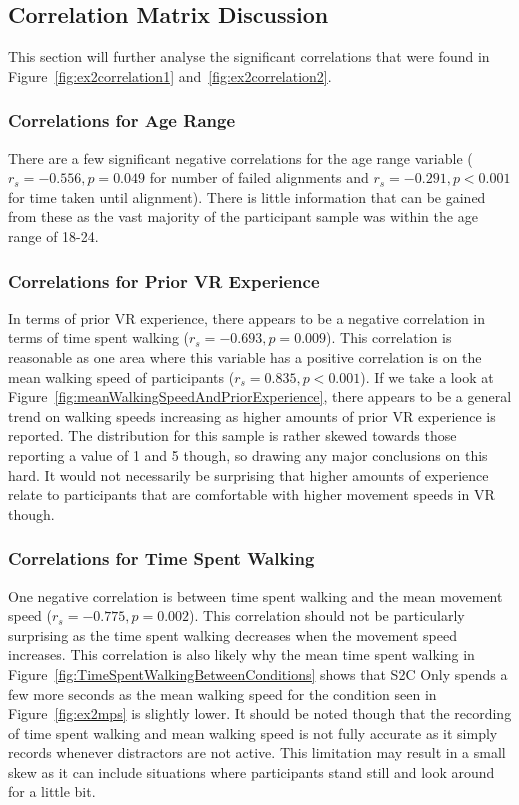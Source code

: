 \subsection{Correlation Matrix Discussion}\label{sec:ex2correlationAnalysis}
This section will further analyse the significant correlations that were found in Figure~\ref{fig:ex2correlation1} and~\ref{fig:ex2correlation2}. 

\subsubsection{Correlations for Age Range}
There are a few significant negative correlations for the age range variable ($r_s = -0.556, p = 0.049$ for number of failed alignments and $r_s = -0.291, p < 0.001$ for time taken until alignment). There is little information that can be gained from these as the vast majority of the participant sample was within the age range of 18-24. 

\subsubsection{Correlations for Prior VR Experience}
In terms of prior VR experience, there appears to be a negative correlation in terms of time spent walking ($r_s = -0.693, p = 0.009$). This correlation is reasonable as one area where this variable has a positive correlation is on the mean walking speed of participants ($r_s = 0.835, p < 0.001$). If we take a look at Figure~\ref{fig:meanWalkingSpeedAndPriorExperience}, there appears to be a general trend on walking speeds increasing as higher amounts of prior VR experience is reported. The distribution for this sample is rather skewed towards those reporting a value of 1 and 5 though, so drawing any major conclusions on this hard. It would not necessarily be surprising that higher amounts of experience relate to participants that are comfortable with higher movement speeds in VR though.

\subsubsection{Correlations for Time Spent Walking}
One negative correlation is between time spent walking and the mean movement speed ($r_s = -0.775, p = 0.002$). This correlation should not be particularly surprising as the time spent walking decreases when the movement speed increases. This correlation is also likely why the mean time spent walking in Figure~\ref{fig:TimeSpentWalkingBetweenConditions} shows that S2C Only spends a few more seconds as the mean walking speed for the condition seen in Figure~\ref{fig:ex2mps} is slightly lower. It should be noted though that the recording of time spent walking and mean walking speed is not fully accurate as it simply records whenever distractors are not active. This limitation may result in a small skew as it can include situations where participants stand still and look around for a little bit. 

